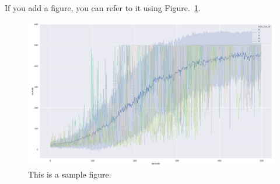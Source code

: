 \documentclass[12pt]{article}
\begin{document}
If you add a figure, you can refer to it using Figure.~\ref*{fig:fig1}.

\begin{figure}[h] 
	\centering  %
    \includegraphics[width=0.9\columnwidth]{img/training.pdf}
	\caption{This is a sample figure.}
	\label{fig:fig1}
\end{figure}


\end{document}
